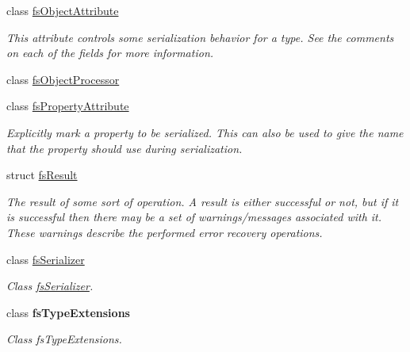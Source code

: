 \begin{DoxyCompactItemize}
class \hyperlink{class_full_serializer_1_1fs_object_attribute}{fs\+Object\+Attribute}
\begin{DoxyCompactList}\small\item\em This attribute controls some serialization behavior for a type. See the comments on each of the fields for more information. \end{DoxyCompactList}\item 
class \hyperlink{class_full_serializer_1_1fs_object_processor}{fs\+Object\+Processor}
\item 
class \hyperlink{class_full_serializer_1_1fs_property_attribute}{fs\+Property\+Attribute}
\begin{DoxyCompactList}\small\item\em Explicitly mark a property to be serialized. This can also be used to give the name that the property should use during serialization. \end{DoxyCompactList}\item 
struct \hyperlink{struct_full_serializer_1_1fs_result}{fs\+Result}
\begin{DoxyCompactList}\small\item\em The result of some sort of operation. A result is either successful or not, but if it is successful then there may be a set of warnings/messages associated with it. These warnings describe the performed error recovery operations. \end{DoxyCompactList}\item 
class \hyperlink{class_full_serializer_1_1fs_serializer}{fs\+Serializer}
\begin{DoxyCompactList}\small\item\em Class \hyperlink{class_full_serializer_1_1fs_serializer}{fs\+Serializer}. \end{DoxyCompactList}\item 
class {\bfseries fs\+Type\+Extensions}
\begin{DoxyCompactList}\small\item\em Class fs\+Type\+Extensions. \end{DoxyCompactList}\end{DoxyCompactItemize}
